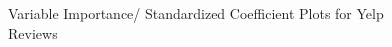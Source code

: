 \documentclass{article}
\begin{document}
\begin{figure}[H]
{\begin{minipage}[t]{0.48\textwidth}
\end{minipage}
}
\caption{Variable Importance/ Standardized Coefficient Plots for Yelp Reviews}
\label{Fig.y.v}
\end{figure}
\end{document}
